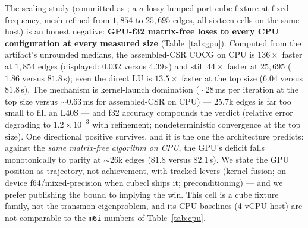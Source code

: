 \documentclass{anvil-paper}
\begin{document}
The scaling study (committed as
; a $\sigma$-lossy
lumped-port cube fixture at fixed frequency, mesh-refined from $1{,}854$
to $25{,}695$ edges, all sixteen cells on the same host) is an honest
negative: \textbf{GPU-f32 matrix-free loses to every CPU configuration
at every measured size} (Table~\ref{tab:gpu}). Computed from the
artifact's unrounded medians, the assembled-CSR COCG on CPU is
$136\times$ faster at $1{,}854$ edges (displayed: $0.032$ versus
$4.39$\,s) and still $44\times$
faster at $25{,}695$ ($1.86$ versus $81.8$\,s); even the direct LU is
$13.5\times$ faster at the top size ($6.04$ versus $81.8$\,s). The
mechanism is kernel-launch domination (${\sim}28$\,ms per iteration at
the top size versus ${\sim}0.63$\,ms for assembled-CSR on CPU) ---
$25.7$k edges is far too small to fill an L40S --- and f32 accuracy
compounds the verdict (relative error degrading to $1.2\times10^{-3}$
with refinement; nondeterministic convergence at the top size). One
directional positive survives, and it is the one the architecture
predicts: against the \emph{same matrix-free algorithm on CPU}, the
GPU's deficit falls monotonically to parity at ${\sim}26$k edges
($81.8$ versus $82.1$\,s). We state the GPU position as trajectory, not
achievement, with tracked levers (kernel fusion; on-device
f64/mixed-precision when cubecl ships it; preconditioning) --- and we
prefer publishing the bound to implying the win. This cell is a cube
fixture family, not the transmon eigenproblem, and its CPU baselines
(4-vCPU host) are not comparable to the \texttt{m6i} numbers of
Table~\ref{tab:cpu}.
\end{document}

